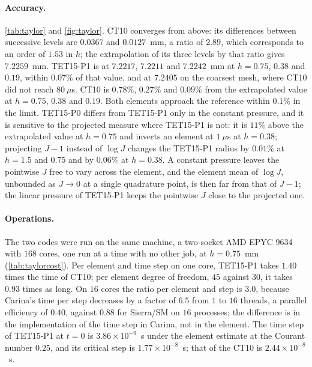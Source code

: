 \documentclass{article}
\theoremstyle{definition}
\theoremstyle{plain}
\begin{document}
\paragraph{Accuracy.} \cref{tab:taylor} and \cref{fig:taylor}.
CT10 converges from above: its differences between
successive levels are $0.0367$ and $0.0127$~mm, a ratio of $2.89$, which
corresponds to an order of $1.53$ in $h$; the extrapolation of its three
levels by that ratio gives $7.2259$~mm. TET15-P1 is at $7.2217$,
$7.2211$ and $7.2242$~mm at $h = 0.75$, $0.38$ and $0.19$, within $0.07\%$ of
that value, and at $7.2405$ on the coarsest mesh, where CT10 did not
reach $80~\mu$s. CT10 is $0.78\%$, $0.27\%$ and
$0.09\%$ from the extrapolated value at $h = 0.75$, $0.38$ and $0.19$. Both
elements approach the reference within $0.1\%$ in the limit. TET15-P0
differs from TET15-P1 only in the constant pressure, and it is sensitive to
the projected measure where TET15-P1 is not: it is $11\%$ above the
extrapolated value at $h = 0.75$ and inverts an element at $1~\mu$s at
$h = 0.38$; projecting
$J - 1$ instead of $\log J$ changes the TET15-P1 radius by $0.01\%$ at
$h = 1.5$ and $0.75$ and by $0.06\%$ at $h = 0.38$. A constant pressure leaves
the pointwise $J$ free to vary across the element, and the element mean of
$\log J$, unbounded as $J \to 0$ at a single quadrature point, is then far
from that of $J - 1$; the linear pressure of TET15-P1 keeps the pointwise $J$
close to the projected one.

\paragraph{Operations.} The two codes were run on the same machine, a
two-socket AMD EPYC 9634 with $168$ cores, one run at a time with no other
job, at $h = 0.75$~mm (\cref{tab:taylorcost}). Per element and time
step on one core, TET15-P1 takes $1.40$ times the time of CT10; per element degree of freedom, $45$ against $30$, it takes
$0.93$ times as long. On $16$ cores the ratio per element and step is
$3.0$, because Carina's time per step decreases by a factor of $6.5$ from
$1$ to $16$ threads, a parallel efficiency of $0.40$, against $0.88$ for
Sierra/SM on $16$ processes; the difference is in the implementation of the
time step in Carina, not in the element. The time step of TET15-P1 at $t = 0$ is
$3.86 \times 10^{-9}$~s under the element estimate at the Courant number
$0.25$, and its critical step is $1.77 \times 10^{-8}$~s; that of the
CT10 is $2.44 \times 10^{-8}$~s.
\end{document}
